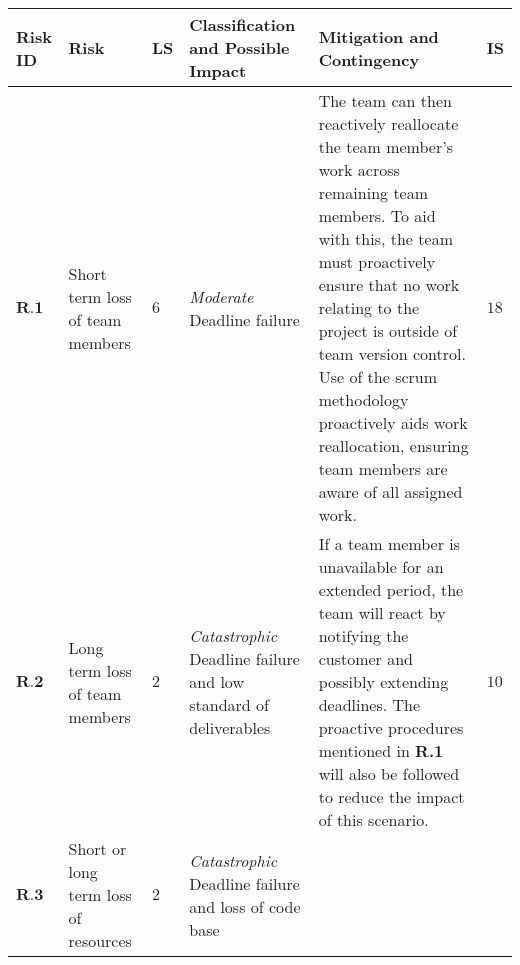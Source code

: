 \begin{longtable}[H]{| p{0.6cm} | p{2cm} | p{0.3cm} | p{2.6cm} | p{8.1cm} | p{0.7cm} |}
    \hline
    \cellcolor{titleColor}\textbf{Risk ID}   & \cellcolor{titleColor}\textbf{Risk}                                             &\cellcolor{titleColor}\textbf{LS}        & \cellcolor{titleColor}\textbf{Classification and Possible Impact}                                 & \cellcolor{titleColor}\textbf{Mitigation and Contingency} & \cellcolor{titleColor}\textbf{IS} \\ \hline                                                                                                                                                                                                                                                                                                                                                                                                                                                                                                                                
    $\textbf{R.1}$   & Short term loss of team members                  & $6$       & \textit{Moderate}
\newline Deadline failure                                        
      &  The team can then reactively reallocate the team member's work across remaining team members. To aid with this, the team must proactively ensure that no work relating to the project is outside of team version control. Use of the scrum methodology proactively aids work reallocation, ensuring team members are aware of all assigned work. 
      & $18$    \\ \hline
    $\textbf{R.2}$    & Long term loss of team members                   & $2$ & \textit{Catastrophic}
\newline Deadline failure and low standard of deliverables 
    & If a team member is unavailable for an extended period, the team will react by notifying the customer and possibly extending deadlines. The proactive procedures mentioned in \textbf{R.1} will also be followed to reduce the impact of this scenario.                                                                                                                                                                                                                                                                                            
    & $10$    \\ \hline
    $\textbf{R.3}$     & Short or long term loss of resources             & $2$ & \textit{Catastrophic}
\newline Deadline failure and loss of code base              

\end{longtable}
